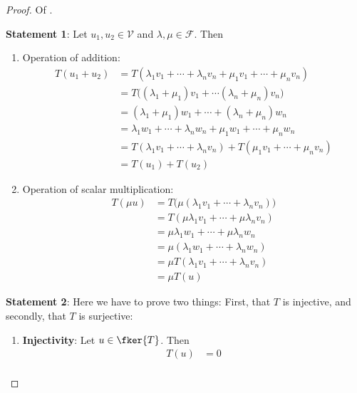 \begin{proof}
	Of .
	\begin{flushleft}
		\textbf{Statement 1}: Let $u_1,u_2\in\mathcal{V}$ and $\lambda,\mu\in\mathcal{F}$. Then
		\begin{enumerate}
			\item Operation of addition:
			      \begin{align*}
				      T(u_1+u_2) & =T(\lambda_1v_1+\cdots+\lambda_nv_n+\mu_1v_1+\cdots+\mu_nv_n)    \\
				                 & =T\big((\lambda_1+\mu_1)v_1+\cdots(\lambda_n+\mu_n)v_n\big)      \\
				                 & =(\lambda_1+\mu_1)w_1+\cdots+(\lambda_n+\mu_n)w_n                \\
				                 & =\lambda_1w_1+\cdots+\lambda_nw_n+\mu_1w_1+\cdots+\mu_nw_n       \\
				                 & =T(\lambda_1v_1+\cdots+\lambda_nv_n)+T(\mu_1v_1+\cdots+\mu_nv_n) \\
				                 & =T(u_1)+T(u_2)
			      \end{align*}
			\item Operation of scalar multiplication:
			      \begin{align*}
				      T(\mu u) & =T\big(\mu(\lambda_1v_1+\cdots+\lambda_nv_n)\big) \\
				               & =T(\mu\lambda_1v_1+\cdots+\mu\lambda_nv_n)        \\
				               & =\mu\lambda_1w_1+\cdots+\mu\lambda_nw_n           \\
				               & =\mu(\lambda_1w_1+\cdots+\lambda_nw_n)            \\
				               & =\mu T(\lambda_1v_1+\cdots+\lambda_nv_n)          \\
				               & =\mu T(u)
			      \end{align*}
		\end{enumerate}
	\end{flushleft}
	\begin{flushleft}
		\textbf{Statement 2}: Here we have to prove two things: First, that $T$
		is injective, and secondly, that $T$ is surjective:
		\begin{enumerate}
			\item \textbf{Injectivity}: Let $u\in\fker{T}$. Then
			      \begin{align*}
				      T(u) & =0                                   \\

\end{align*}
\end{enumerate}
\end{flushleft}
\end{proof}
